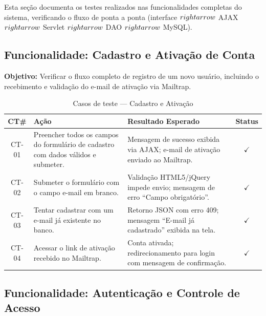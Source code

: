 Esta seção documenta os testes realizados nas funcionalidades completas do sistema,
verificando o fluxo de ponta a ponta (interface $\\rightarrow$ AJAX $\\rightarrow$ Servlet $\\rightarrow$ DAO $\\rightarrow$ MySQL).

\subsection{Funcionalidade: Cadastro e Ativação de Conta}

\textbf{Objetivo:} Verificar o fluxo completo de registro de um novo usuário, incluindo o
recebimento e validação do e-mail de ativação via Mailtrap.

\begin{table}[h!]
	\centering
	\caption{Casos de teste --- Cadastro e Ativação}
	\label{tab:teste_cadastro}
	\begin{tabular}{|c|p{6cm}|p{6cm}|c|}
		\hline
		\textbf{CT\#} & \textbf{Ação} & \textbf{Resultado Esperado} & \textbf{Status} \\ \hline
		CT-01 & Preencher todos os campos do formulário de cadastro com dados válidos e submeter. & Mensagem de sucesso exibida via AJAX; e-mail de ativação enviado ao Mailtrap. & $\checkmark$ \\ \hline
		CT-02 & Submeter o formulário com o campo e-mail em branco. & Validação HTML5/jQuery impede envio; mensagem de erro ``Campo obrigatório''. & $\checkmark$ \\ \hline
		CT-03 & Tentar cadastrar com um e-mail já existente no banco. & Retorno JSON com erro 409; mensagem ``E-mail já cadastrado'' exibida na tela. & $\checkmark$ \\ \hline
		CT-04 & Acessar o link de ativação recebido no Mailtrap. & Conta ativada; redirecionamento para login com mensagem de confirmação. & $\checkmark$ \\ \hline
	\end{tabular}
\end{table}

\subsection{Funcionalidade: Autenticação e Controle de Acesso}

